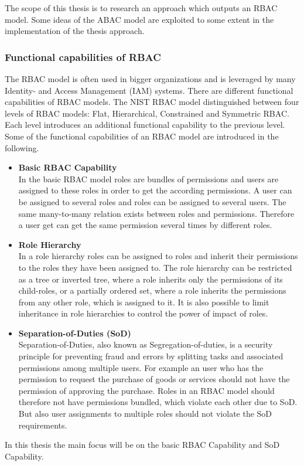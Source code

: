 \begin{itemize}
        \end{itemize}
        The scope of this thesis is to research an approach which outputs an RBAC model. Some ideas of the ABAC model are exploited to some extent in the implementation of the thesis approach.\\
        \subsubsection{Functional capabilities of RBAC}
        The RBAC model is often used in bigger organizations\cite{o20102010} and is leveraged by many Identity- and Access Management (IAM) systems. There are different functional capabilities of RBAC models. The NIST RBAC model \cite{sandhu2000nist} distinguished between four levels of RBAC models: Flat, Hierarchical, Constrained and Symmetric RBAC. Each level introduces an additional functional capability to the previous level. Some of the functional capabilities of an RBAC model are introduced in the following.
        \begin{itemize}
            \item \textbf{Basic RBAC Capability}\\
            In the basic RBAC model roles are bundles of permissions and users are assigned to these roles in order to get the according permissions. A user can be assigned to several roles and roles can be assigned to several users. The same many-to-many relation exists between roles and permissions. Therefore a user get can get the same permission several times by different roles.
            \item \textbf{Role Hierarchy}\\
            In a role hierarchy roles can be assigned to roles and inherit their permissions to the roles they have been assigned to. The role hierarchy can be restricted as a tree or inverted tree, where a role inherits only the permissions of its child-roles, or a partially ordered set, where a role inherits the permissions from any other role, which is assigned to it. It is also possible to limit inheritance in role hierarchies to control the power of impact of roles.
            \item \textbf{Separation-of-Duties (SoD)}\\
            Separation-of-Duties, also known as Segregation-of-duties, is a security principle for preventing fraud and errors by splitting tasks and associated permissions among multiple users. For example an user who has the permission to request the purchase of goods or services should not have the permission of approving the purchase. Roles in an RBAC model should therefore not have permissions bundled, which violate each other due to SoD. But also user assignments to multiple roles should not violate the SoD requirements.
        \end{itemize}
        In this thesis the main focus will be on the basic RBAC Capability and SoD Capability.\\
